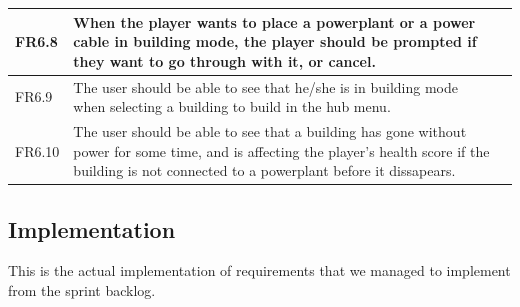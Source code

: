 \begin{tabular}{| p{1cm} | p{8cm} | p{3cm} |}
		FR6.8 & When the player wants to place a powerplant or a power cable in building mode, 
		the player should be prompted if they want to go through with it, or cancel. & \\ \hline

		FR6.9 & The user should be able to see that he/she is in building mode when selecting 
		a building to build in the hub menu. & \\ \hline

		FR6.10 & The user should be able to see that a building has gone without power for 
		some time, and is affecting the player's health score if the building is not connected 
		to a powerplant before it dissapears. & \\ \hline

	\end{tabular}

\subsection{Implementation}
	
	This is the actual implementation of requirements that we managed to implement
	from the sprint backlog.
	
